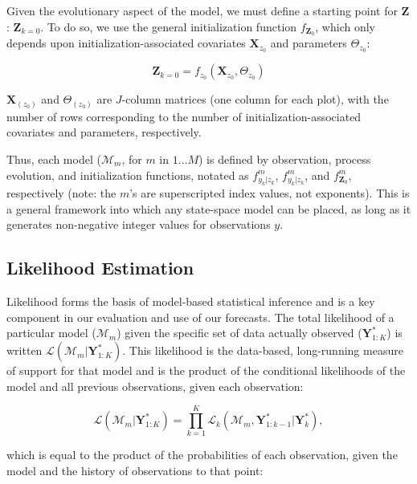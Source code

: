 \documentclass{article}
\begin{document}
Given the evolutionary aspect of the model, we must define a starting point for $\textbf{Z}$: $\textbf{Z}_{k=0}$. To do so, we use the general initialization function $f_{\textbf{Z}_0}$, which only depends upon initialization-associated covariates $\textbf{X}_{z_0}$ and parameters $\Theta_{z_0}$:

\begin{equation}
\label{eq:3}
\textbf{Z}_{k=0} = f_{z_0}(\textbf{X}_{z_0}, \Theta_{z_0})
\end{equation}

$\textbf{X}_{(z_0)}$ and $\Theta_{(z_0)}$ are $J$-column matrices (one column for each plot), with the number of rows corresponding to the number of initialization-associated covariates and parameters, respectively. 

Thus, each model ($\mathcal{M}_m$, for $m$ in $1 \ldots M$) is defined by observation, process evolution, and initialization functions, notated as $f^m_{y_k|z_k}$, $f^m_{y_k|z_k}$, and $f^m_{\textbf{Z}_0}$, respectively (note: the $m$'s are superscripted index values, not exponents). This is a general framework into which any state-space model can be placed, as long as it generates non-negative integer values for observations $y$. 

\subsection{Likelihood Estimation}
\label{subsec:devmods_le}

Likelihood forms the basis of model-based statistical inference \citep{Pawitan2001} and is a key component in our evaluation and use of our forecasts. The total likelihood of a particular model ($\mathcal{M}_m$) given the specific set of data actually observed ($\textbf{Y}^{*}_{1:K}$) is written $\mathcal{L}(\mathcal{M}_m|\textbf{Y}^{*}_{1:K})$. This likelihood is the data-based, long-running measure of support for that model and is the product of the conditional likelihoods of the model and all previous observations, given each observation:

\begin{equation}
\label{eq:4}
\mathcal{L}(\mathcal{M}_m|\textbf{Y}^{*}_{1:K}) = \prod_{k = 1}^{K}{\mathcal{L}_k(\mathcal{M}_m, \textbf{Y}^{*}_{1:k-1}|\textbf{Y}^{*}_{k})},
\end{equation}

which is equal to the product of the probabilities of each observation, given the model and the history of observations to that point:
\end{document}
